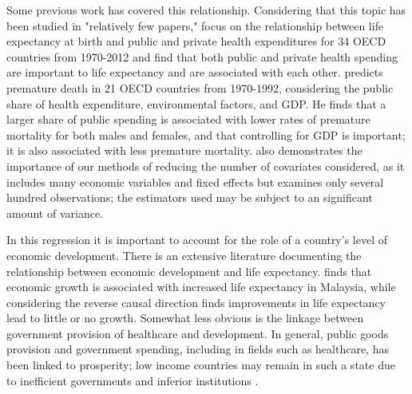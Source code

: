 \documentclass[10pt]{article}
\begin{document}
        Some previous work has covered this relationship. Considering that this topic has been studied in "relatively few papers," \cite{linden_life_2017} focus on the relationship between life expectancy at birth and public and private health expenditures for 34 OECD countries from 1970-2012 and find that both public and private health spending are important to life expectancy and are associated with each other. \cite{or_determinants_2000} predicts premature death in 21 OECD countries from 1970-1992, considering the public share of health expenditure, environmental factors, and GDP. He finds that a larger share of public spending is associated with lower rates of premature mortality for both males and females, and that controlling for GDP is important; it is also associated with less premature mortality. \cite{or_determinants_2000} also demonstrates the importance of our methods of reducing the number of covariates considered, as it includes many economic variables and fixed effects but examines only several hundred observations; the estimators used may be subject to an significant amount of variance.

        In this regression it is important to account for the role of a country's level of economic development. There is an extensive literature documenting the relationship between economic development and life expectancy. \cite{ling_testing_2017} finds that economic growth is associated with increased life expectancy in Malaysia, while considering the reverse causal direction \cite{acemoglu_disease_2007} finds improvements in life expectancy lead to little or no growth. Somewhat less obvious is the linkage between government provision of healthcare and development. In general, public goods provision and government spending, including in fields such as healthcare, has been linked to prosperity; low income countries may remain in such a state due to inefficient governments and inferior institutions \citep{wu_impact_2010}.
\end{document}
